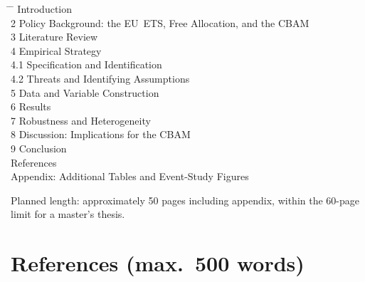 \documentclass[12pt,a4paper]{article}
\begin{document}
\begin{tabbing}
\hspace{1.2cm} \= \hspace{12.5cm} \=  \> Introduction  \\
2 \> Policy Background: the EU~ETS, Free Allocation, and the CBAM  \\
3 \> Literature Review  \\
4 \> Empirical Strategy  \\
\> \hspace{0.5cm} 4.1 Specification and Identification  \\
\> \hspace{0.5cm} 4.2 Threats and Identifying Assumptions  \\
5 \> Data and Variable Construction  \\
6 \> Results  \\
7 \> Robustness and Heterogeneity  \\
8 \> Discussion: Implications for the CBAM  \\
9 \> Conclusion  \\
\> References  \\
\> Appendix: Additional Tables and Event-Study Figures  \\
\end{tabbing}

Planned length: approximately 50 pages including appendix, within the 60-page limit for a master's thesis.

\section{References (max.\ 500 words)}
\end{document}
